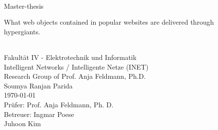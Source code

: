 \documentclass[a4paper,11pt,abstracton,twoside,titlepage,openany,nochapterprefix,noappendixprefix,liststotoc,bibtotoc,normalheadings,pointlessnumbers,BCOR1cm]{article}
\begin{document}
\begin{titlepage}
\thispagestyle{fancy}

\chead{}
\lfoot{}
\cfoot{}
\rfoot{}



\begin{Large}
\vspace{5em}
\center
	\mbox{}\\
	\vspace{5em}
	Master-thesis
	\vspace{3em}

	\begin{Huge}
	What web objects contained in popular websites are delivered through hypergiants.
	\end{Huge}
	
	\mbox{}\\
	\vspace{5em}
	Fakultät IV - Elektrotechnik und Informatik\\
	Intelligent Networks / Intelligente Netze (INET)\\
	Research Group of Prof. Anja Feldmann, Ph.D.\\
	\vspace{3em}
	Soumya Ranjan Parida\\
	\today\\

	\vspace{4 em}
	Prüfer: Prof. Anja Feldmann, Ph. D.\\
	\vspace{-.5 ex}
	Betreuer: Ingmar Poese\\
	Juhoon Kim\\
\end{Large}
\end{titlepage}
\pagestyle{empty}

\end{document}
